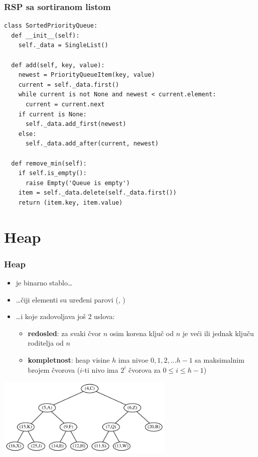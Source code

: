 \documentclass[compress]{beamer}
\begin{document}
\begin{frame}
  \frametitle{RSP sa sortiranom listom}
\begin{verbatim}
class SortedPriorityQueue:
  def __init__(self):
    self._data = SingleList()
    
  def add(self, key, value):
    newest = PriorityQueueItem(key, value)
    current = self._data.first()
    while current is not None and newest < current.element:
      current = current.next 
    if current is None:
      self._data.add_first(newest)
    else:
      self._data.add_after(current, newest)
    
  def remove_min(self):
    if self.is_empty():
      raise Empty('Queue is empty')
    item = self._data.delete(self._data.first())
    return (item.key, item.value)
\end{verbatim}
\end{frame}

\section[Heap]{Heap}
\begin{frame}[fragile]
  \frametitle{Heap}
  \begin{itemize}
    \item {} je binarno stablo\ldots 
    \item \ldots čiji elementi su uređeni parovi (, )
    \item \ldots i koje zadovoljava još 2 uslova:
    \begin{itemize}
      \item \textbf{redosled}: za svaki čvor $n$ osim korena ključ od $n$ je veći ili jednak ključu roditelja od $n$
      \item \textbf{kompletnost}: heap visine $h$ ima nivoe $0, 1, 2,\ldots h-1$ sa maksimalnim brojem čvorova ($i$-ti nivo ima $2^i$ čvorova za $0\leq i\leq
      h-1$)
    \end{itemize}
  \end{itemize}
  \begin{center}
    \includegraphics[width=8.5cm]{asp-09-pic02.pdf}
  \end{center}
\end{frame}
\end{document}

